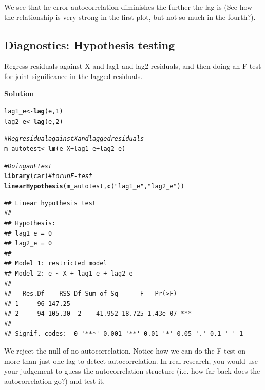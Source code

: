 \documentclass{article}\usepackage[]{graphicx}\usepackage[]{color}
\makeatletter
\newcommand{\hlnum}[1]{\textcolor[rgb]{0.686,0.059,0.569}{#1}}%
\newcommand{\hlstr}[1]{\textcolor[rgb]{0.192,0.494,0.8}{#1}}%
\newcommand{\hlcom}[1]{\textcolor[rgb]{0.678,0.584,0.686}{\textit{#1}}}%
\newcommand{\hlopt}[1]{\textcolor[rgb]{0,0,0}{#1}}%
\newcommand{\hlstd}[1]{\textcolor[rgb]{0.345,0.345,0.345}{#1}}%
\newcommand{\hlkwb}[1]{\textcolor[rgb]{0.69,0.353,0.396}{#1}}%
\newcommand{\hlkwd}[1]{\textcolor[rgb]{0.737,0.353,0.396}{\textbf{#1}}}%
\newenvironment{kframe}{%
 \def\at@end@of@kframe{}%
 \ifinner\ifhmode%
  \def\at@end@of@kframe{\end{minipage}}%
  \begin{minipage}{\columnwidth}%
 \fi\fi%
 \def\FrameCommand##1{\hskip\@totalleftmargin \hskip-\fboxsep
 \colorbox{shadecolor}{##1}\hskip-\fboxsep
     \hskip-\linewidth \hskip-\@totalleftmargin \hskip\columnwidth}%
 \MakeFramed {\advance\hsize-\width
   \@totalleftmargin\z@ \linewidth\hsize
   \@setminipage}}%
 {\par\unskip\endMakeFramed%
 \at@end@of@kframe}
\newenvironment{knitrout}{}{} %
\makeatother
\begin{document}
We see that he error autocorrelation diminishes the further the lag is (See how the relationship is very strong in the first plot, but not so much in the fourth?).

\subsection{Diagnostics: Hypothesis testing}

Regress residuals against X and lag1 and lag2 residuals, and then doing an F test for joint significance in the lagged residuals.

\textbf{Solution}

\begin{knitrout}
\color{fgcolor}\begin{kframe}
\begin{alltt}
\hlstd{lag1_e} \hlkwb{<-} \hlkwd{lag}\hlstd{(e,} \hlnum{1}\hlstd{)}
\hlstd{lag2_e} \hlkwb{<-} \hlkwd{lag}\hlstd{(e,} \hlnum{2}\hlstd{)}

\hlcom{# Reg residual against X and lagged residuals}
\hlstd{m_autotest} \hlkwb{<-} \hlkwd{lm}\hlstd{(e} \hlopt{~} \hlstd{X} \hlopt{+} \hlstd{lag1_e} \hlopt{+} \hlstd{lag2_e)}

\hlcom{# Doing an F test}
\hlkwd{library}\hlstd{(car)} \hlcom{# to run F-test}
\hlkwd{linearHypothesis}\hlstd{(m_autotest,} \hlkwd{c}\hlstd{(}\hlstr{"lag1_e"}\hlstd{,} \hlstr{"lag2_e"}\hlstd{))}
\end{alltt}
\begin{verbatim}
## Linear hypothesis test
## 
## Hypothesis:
## lag1_e = 0
## lag2_e = 0
## 
## Model 1: restricted model
## Model 2: e ~ X + lag1_e + lag2_e
## 
##   Res.Df    RSS Df Sum of Sq      F   Pr(>F)    
## 1     96 147.25                                 
## 2     94 105.30  2    41.952 18.725 1.43e-07 ***
## ---
## Signif. codes:  0 '***' 0.001 '**' 0.01 '*' 0.05 '.' 0.1 ' ' 1
\end{verbatim}
\end{kframe}
\end{knitrout}

We reject the null of no autocorrelation. Notice how we can do the F-test on more than just one lag to detect autocorrelation. In real research, you would use your judgement to guess the autocorrelation structure (i.e. how far back does the autocorrelation go?) and test it.
\end{document}
